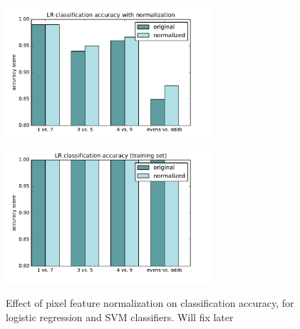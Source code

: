 \documentclass{article}
\begin{document}
\begin{multicols}{2}
\begin{figure}[h]
   \centering
	\includegraphics[width=3in]{img/4-1-normalization.pdf}
	\includegraphics[width=3in]{img/4-1-normalization-train.pdf}
   \caption{Effect of pixel feature normalization on classification accuracy, for logistic regression and SVM classifiers. Will fix later}
   \label{fig:4-1-normalization}
\end{figure}

\end{multicols}
\end{document}
